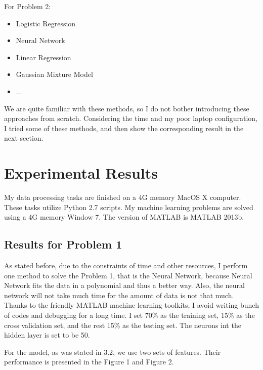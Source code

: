 \documentclass{sig-alternate}
\begin{document}
For Problem 2:
\begin{itemize}
	\item Logistic Regression
    \item Neural Network
    \item Linear Regression
    \item Gaussian Mixture Model
    \item ...
\end{itemize}

We are quite familiar with these methods, so I do not bother introducing these approaches from scratch. Considering the time and my poor laptop configuration, I tried some of these methods, and then show the corresponding result in the next section.




\section{Experimental Results}
My data processing tasks are finished on a 4G memory MacOS X computer. These tasks utilize Python 2.7 scripts. My machine learning problems are solved using a 4G memory Window 7. The version of MATLAB is MATLAB 2013b.

\subsection{Results for Problem 1}
As stated before, due to the constraints of time and other resources, I perform one method to solve the Problem 1, that is the Neural Network, because Neural Network fits the data in a polynomial and thus a better way. Also, the neural network will not take much time for the amount of data is not that much. Thanks to the friendly MATLAB machine learning toolkits\cite{nn}, I avoid writing bunch of codes and debugging for a long time. I set 70\% as the training set, 15\% as the cross validation set, and the rest 15\% as the testing set. The neurons int the hidden layer is set to be 50.

For the model, as was stated in 3.2, we use two sets of features. Their performance is presented in the Figure 1 and Figure 2.
\end{document}
